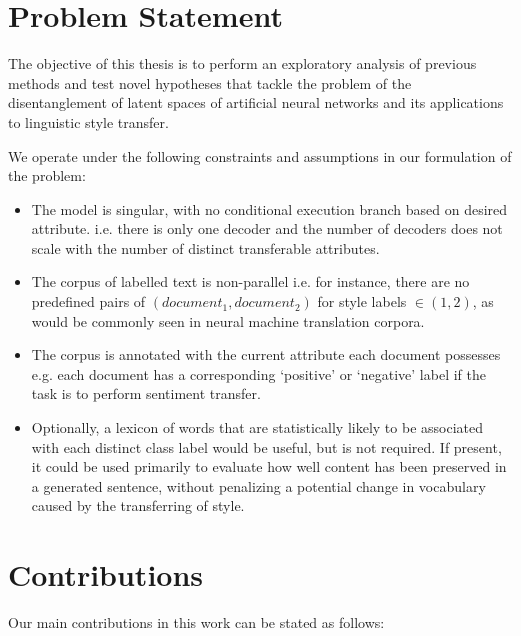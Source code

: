 \section{Problem Statement}

The objective of this thesis is to perform an exploratory analysis of previous methods and test novel hypotheses that tackle the problem of the disentanglement of latent spaces of artificial neural networks and its applications to linguistic style transfer.

We operate under the following constraints and assumptions in our formulation of the problem:

\begin{itemize}
	\item The model is singular, with no conditional execution branch based on desired attribute. i.e. there is only one decoder and the number of decoders does not scale with the number of distinct transferable attributes.
	\item The corpus of labelled text is non-parallel i.e. for instance, there are no predefined pairs of $(document_1, document_2)$ for style labels $\in (1, 2)$, as would be commonly seen in neural machine translation corpora.
	\item The corpus is annotated with the current attribute each document possesses e.g. each document has a corresponding `positive' or `negative' label if the task is to perform sentiment transfer.
	\item Optionally, a lexicon of words that are statistically likely to be associated with each distinct class label would be useful, but is not required. If present, it could be used primarily to evaluate how well content has been preserved in a generated sentence, without penalizing a potential change in vocabulary caused by the transferring of style.
\end{itemize}


\section{Contributions}

Our main contributions in this work can be stated as follows:

